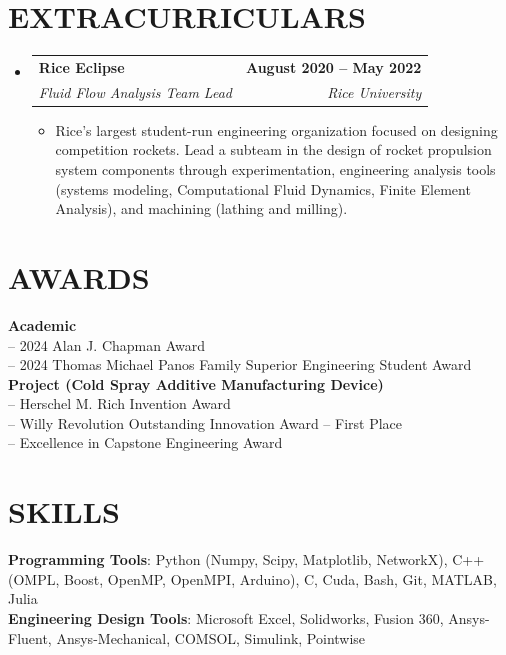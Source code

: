 \documentclass[letterpaper,11pt]{article}
\makeatletter
\newcommand{\resumeItem}[1]{
  \item \small{
    {#1 \vspace{-2pt}}
  }
}
\newcommand{\resumeSubheading}[4]{
  \vspace{-2pt}\item
    \begin{tabular*}{1.0\textwidth}[t]{l@{\extracolsep{\fill}}r}
      \textbf{#1} & \textbf{\small #2} \\
      \textit{\small#3} & \textit{\small #4} \\
    \end{tabular*}\vspace{-7pt}
}
\newcommand{\resumeSubHeadingListStart}{\begin{itemize}[leftmargin=0.0in, label={}]}
\newcommand{\resumeSubHeadingListEnd}{\end{itemize}}
\newcommand{\resumeItemListStart}{\begin{itemize}}
\newcommand{\resumeItemListEnd}{\end{itemize}\vspace{-5pt}}
\makeatother
\begin{document}
\section{EXTRACURRICULARS}
    
    \resumeSubHeadingListStart
        
        \resumeSubheading{Rice Eclipse}{August 2020 -- May 2022}{Fluid Flow Analysis Team Lead}{Rice University}
          \resumeItemListStart
             \resumeItem{Rice's largest student-run engineering organization focused on designing competition rockets. Lead a subteam in the design of rocket propulsion system components through experimentation, engineering analysis tools (systems modeling, Computational Fluid Dynamics, Finite Element Analysis), and machining (lathing and milling).}
          \resumeItemListEnd   
        
    \resumeSubHeadingListEnd
\vspace{-10pt}

\section{AWARDS}
 \begin{itemize}[leftmargin=0.15in, label={}]
    \small{\item{
     \textbf{Academic} \\
     {-- 2024 Alan J. Chapman Award} \\
     {-- 2024 Thomas Michael Panos Family Superior Engineering Student Award} \\
     \vspace{2pt}
     \textbf{Project (Cold Spray Additive Manufacturing Device)} \\
     {-- Herschel M. Rich Invention Award} \\
     {-- Willy Revolution Outstanding Innovation Award -- First Place}\\ 
     {-- Excellence in Capstone Engineering Award} \\
    }}
 \end{itemize}
 \vspace{-10pt}

\section{SKILLS}
 \begin{itemize}[leftmargin=0.15in, label={}]
    \small{\item{
     \textbf{Programming Tools}{: Python (Numpy, Scipy, Matplotlib, NetworkX), C++ (OMPL, Boost, OpenMP, OpenMPI, Arduino), C, Cuda, Bash, Git, MATLAB, Julia} \\
     \textbf{Engineering Design Tools}{: Microsoft Excel, Solidworks, Fusion 360, Ansys-Fluent, Ansys-Mechanical, COMSOL, Simulink, Pointwise} \\
    }}
 \end{itemize}
 \vspace{-10pt}
\end{document}
